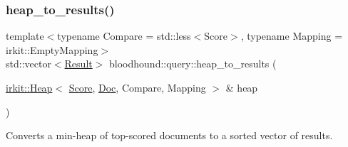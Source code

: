 \subsubsection{\texorpdfstring{heap\+\_\+to\+\_\+results()}{heap\_to\_results()}}
{\footnotesize\ttfamily template$<$typename Compare  = std\+::less$<$\+Score$>$, typename Mapping  = irkit\+::\+Empty\+Mapping$>$ \\
std\+::vector$<$\hyperlink{structbloodhound_1_1query_1_1Result}{Result}$>$ bloodhound\+::query\+::heap\+\_\+to\+\_\+results (\begin{DoxyParamCaption}\item[{\hyperlink{classirkit_1_1Heap}{irkit\+::\+Heap}$<$ \hyperlink{structbloodhound_1_1Score}{Score}, \hyperlink{structbloodhound_1_1Doc}{Doc}, Compare, Mapping $>$ \&}]{heap }\end{DoxyParamCaption})}



Converts a min-\/heap of top-\/scored documents to a sorted vector of results. 

